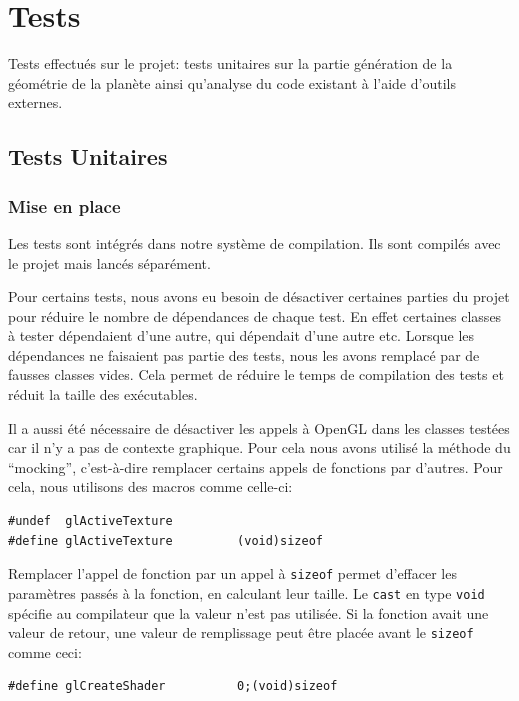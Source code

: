 \chapter{Tests}\label{tests}

Tests effectués sur le projet: tests unitaires sur la partie génération
de la géométrie de la planète ainsi qu'analyse du code existant à l'aide
d'outils externes. 

\section{Tests Unitaires}

\subsection{Mise en place}

Les tests sont intégrés dans notre système de compilation. Ils sont
compilés avec le projet mais lancés séparément.

Pour certains tests, nous avons eu besoin de désactiver certaines
parties du projet pour réduire le nombre de dépendances de chaque test.
En effet certaines classes à tester dépendaient d'une autre, qui dépendait
d'une autre etc. Lorsque les dépendances ne faisaient pas partie des
tests, nous les avons remplacé par de fausses classes vides. Cela permet
de réduire le temps de compilation des tests et réduit la taille des
exécutables.

Il a aussi été nécessaire de désactiver les appels à OpenGL dans les
classes testées car il n'y a pas de contexte graphique. Pour cela nous
avons utilisé la méthode du ``mocking'', c'est-à-dire remplacer certains
appels de fonctions par d'autres. Pour cela, nous utilisons des macros
comme celle-ci:

\lstset{language=C++}
\begin{lstlisting}
#undef  glActiveTexture
#define glActiveTexture         (void)sizeof
\end{lstlisting}

Remplacer l'appel de fonction par un appel à \texttt{sizeof} permet
d'effacer les paramètres passés à la fonction, en calculant leur taille.
Le \texttt{cast} en type \texttt{void} spécifie au compilateur que la valeur
n'est pas utilisée. Si la fonction avait une valeur de retour, une
valeur de remplissage peut être placée avant le \texttt{sizeof} comme
ceci:

\lstset{language=C++}
\begin{lstlisting}
#define glCreateShader          0;(void)sizeof
\end{lstlisting}


